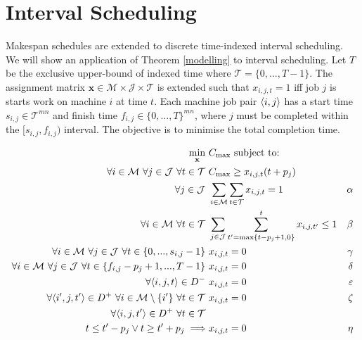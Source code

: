 \section{Interval Scheduling}
\label{interval}

Makespan schedules are extended to discrete time-indexed interval scheduling. We will show an application of Theorem \ref{modelling} to interval scheduling. Let $T$ be the exclusive upper-bound of indexed time where $\mathcal{T}=\{0,...,T-1\}$. The assignment matrix $\mathbf{x}\in\mathcal{M}\times\mathcal{J}\times\mathcal{T}$ is extended such that $x_{i,j,t}=1$ iff job $j$ is starts work on machine $i$ at time $t$. Each machine job pair $\langle{i},{j}\rangle$ has a start time $s_{i,j}\in\mathcal{T}^{mn}$ and finish time $f_{i,j}\in\{0,...,T\}^{mn}$, where $j$ must be completed within the $[s_{i,j},f_{i,j})$ interval. The objective is to minimise the total completion time.

\begin{align*}
	\min_{\mathbf{x}}\ &C_{\max}\text{ subject to:}\\
	\forall i\in\mathcal{M}\ \forall j\in\mathcal{J}\ \forall t\in\mathcal{T}\ &C_{\max}\geq x_{i,j,t}(t+p_j)\\
	\forall j\in\mathcal{J}\ &\sum_{i\in\mathcal{M}}\sum_{t\in\mathcal{T}}x_{i,j,t}=1&\alpha\\
	\forall i\in\mathcal{M}\ \forall t\in\mathcal{T}\ &\sum_{j\in\mathcal{J}}\sum_{t'=\max\{t-p_j+1,0\}}^t x_{i,j,t'}\leq 1&\beta\\
	\forall i\in\mathcal{M}\ \forall j\in\mathcal{J}\ \forall t\in\{0,...,s_{i,j}-1\}\ &x_{i,j,t}=0&\gamma\\
	\forall i\in\mathcal{M}\ \forall j\in\mathcal{J}\ \forall t\in\{f_{i,j}-p_j+1,...,T-1\}\ &x_{i,j,t}=0&\delta\\
	\forall\triple{i}{j}{t}\in D^-\ &x_{i,j,t}=0&\varepsilon\\
	\forall\triple{i'}{j}{t'}\in D^+\ \forall i\in\mathcal{M}\setminus\{i'\}\ \forall t\in\mathcal{T}\ &x_{i,j,t}=0&\zeta\\
	\forall\triple{i}{j}{t'}\in D^+\ \forall t\in\mathcal{T}\ &&\\
	t\leq t'-p_j\lor t\geq t'+p_j\implies&x_{i,j,t}=0&\eta\\
\end{align*}

